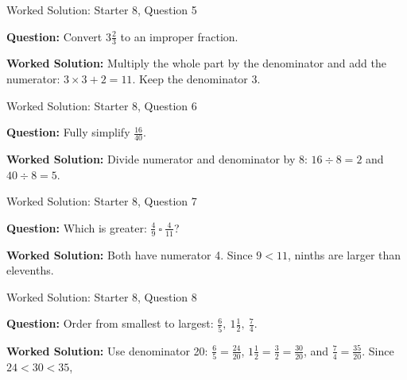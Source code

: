 \documentclass{beamer}
\newcommand{\ashow}[1]{\uncover<2->{\textcolor{red}{\small #1}}}
\begin{document}
\begin{frame}{Worked Solution: Starter 8, Question 5}

\textbf{Question:} Convert $3\frac{2}{3}$ to an improper fraction.

\textbf{Worked Solution:} Multiply the whole part by the denominator and add the numerator: $3\times3+2=11$. Keep the denominator 3. \ashow{$\frac{11}{3}$.}
\end{frame}

\begin{frame}{Worked Solution: Starter 8, Question 6}

\textbf{Question:} Fully simplify $\frac{16}{40}$.

\textbf{Worked Solution:} Divide numerator and denominator by 8: $16 \div 8 = 2$ and $40 \div 8 = 5$. \ashow{$\frac{16}{40}=\frac25$.}
\end{frame}

\begin{frame}{Worked Solution: Starter 8, Question 7}

\textbf{Question:} Which is greater: $\frac{4}{9}\ \square\ \frac{4}{11}$?

\textbf{Worked Solution:} Both have numerator 4. Since $9<11$, ninths are larger than elevenths. \ashow{$\frac49$ is greater.}
\end{frame}

\begin{frame}{Worked Solution: Starter 8, Question 8}

\textbf{Question:} Order from smallest to largest: $\frac{6}{5},\ 1\frac{1}{2},\ \frac{7}{4}$.

\textbf{Worked Solution:} Use denominator 20: $\frac65 = \frac{24}{20}$, $1\frac12 = \frac32 = \frac{30}{20}$, and $\frac74 = \frac{35}{20}$. Since $24<30<35$, \ashow{$\frac65,\ 1\frac12,\ \frac74$.}
\end{frame}
\end{document}
